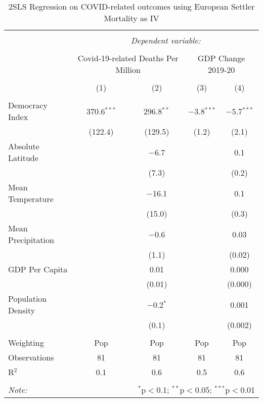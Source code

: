 \begin{table}[!htbp] \centering 
  \caption{2SLS Regression on COVID-related outcomes using European Settler Mortality as IV} 
    \begin{tabular}{@{\extracolsep{0pt}}lcccc} 
\\[-1.8ex]\hline 
\hline \\[-1.8ex] 
 & \multicolumn{4}{c}{\textit{Dependent variable:}} \\ 
\cline{2-5} 
\\[-1.8ex] & \multicolumn{2}{c}{Covid-19-related Deaths Per Million} & \multicolumn{2}{c}{GDP Change 2019-20} \\ 
\\[-1.8ex] & (1) & (2) & (3) & (4)\\ 
\hline \\[-1.8ex] 
 Democracy Index & 370.6$^{***}$ & 296.8$^{**}$ & $-$3.8$^{***}$ & $-$5.7$^{***}$ \\ 
  & (122.4) & (129.5) & (1.2) & (2.1) \\ 
  Absolute Latitude &  & $-$6.7 &  & 0.1 \\ 
  &  & (7.3) &  & (0.2) \\ 
  Mean Temperature &  & $-$16.1 &  & 0.1 \\ 
  &  & (15.0) &  & (0.3) \\ 
  Mean Precipitation &  & $-$0.6 &  & 0.03 \\ 
  &  & (1.1) &  & (0.02) \\ 
  GDP Per Capita &  & 0.01 &  & 0.000 \\ 
  &  & (0.01) &  & (0.000) \\ 
  Population Density &  & $-$0.2$^{*}$ &  & 0.001 \\ 
  &  & (0.1) &  & (0.002) \\ 
 \hline \\[-1.8ex] 
Weighting & Pop & Pop & Pop & Pop \\ 
Observations & 81 & 81 & 81 & 81 \\ 
R$^{2}$ & 0.1 & 0.6 & 0.5 & 0.6 \\ 
\hline 
\hline \\[-1.8ex] 
\textit{Note:}  & \multicolumn{4}{r}{$^{*}$p$<$0.1; $^{**}$p$<$0.05; $^{***}$p$<$0.01} \\ 
\end{tabular} 
\end{table} 